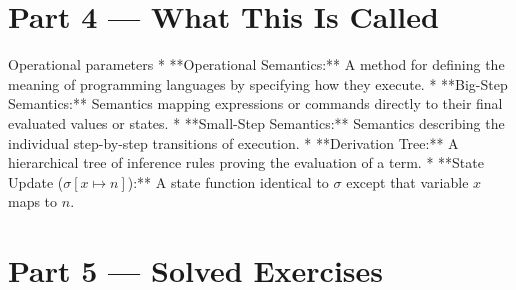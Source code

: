 \documentclass[12pt, a4paper]{book}
\begin{document}
\newpage

\section{Part 4 --- What This Is Called}

\begin{namedconcept}{Operational parameters}
* **Operational Semantics:** A method for defining the meaning of programming languages by specifying how they execute.
* **Big-Step Semantics:** Semantics mapping expressions or commands directly to their final evaluated values or states.
* **Small-Step Semantics:** Semantics describing the individual step-by-step transitions of execution.
* **Derivation Tree:** A hierarchical tree of inference rules proving the evaluation of a term.
* **State Update ($\sigma[x \mapsto n]$):** A state function identical to $\sigma$ except that variable $x$ maps to $n$.
\end{namedconcept}

\newpage

\section{Part 5 --- Solved Exercises}
\end{document}
